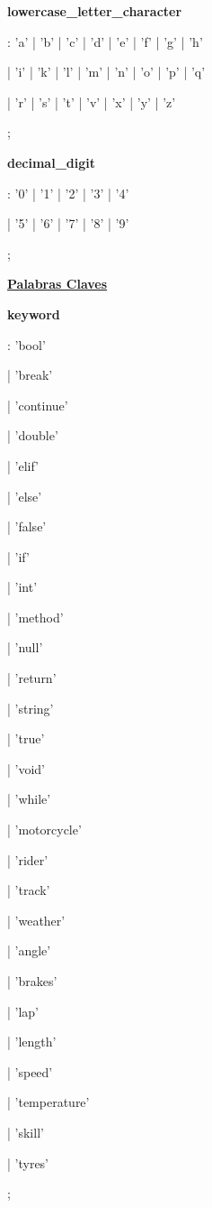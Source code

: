 		\textbf{lowercase\_letter\_character}\par
		: 'a' | 'b' | 'c' | 'd' | 'e' | 'f' | 'g' | 'h'\par 
		| 'i' | 'k' | 'l' | 'm' | 'n' | 'o' | 'p' | 'q'\par
		| 'r' | 's' | 't' | 'v' | 'x' | 'y' | 'z'\par
		;\par
		
		\textbf{decimal\_digit}\par
		: '0' | '1' | '2' | '3' | '4'\par 
		| '5' | '6' | '7' | '8' | '9'\par
		;\par
		
		\underline{\textbf{Palabras Claves}}\par
		\textbf{keyword}\par             
		: 'bool'\par
		| 'break'\par
		| 'continue'\par 
		| 'double'\par
		| 'elif'\par
		| 'else'\par
		| 'false'\par
		| 'if'\par
		| 'int'\par
		| 'method'\par
		| 'null'\par
		| 'return'\par
		| 'string'\par
		| 'true'\par
		| 'void'\par
		| 'while'\par
		
		| 'motorcycle'\par
		| 'rider'\par
		| 'track'\par
		| 'weather'\par
		
		| 'angle'\par
		| 'brakes'\par
		| 'lap'\par
		| 'length'\par
		| 'speed'\par
		| 'temperature'\par
		| 'skill'\par
		| 'tyres'\par		
		;\par
		
